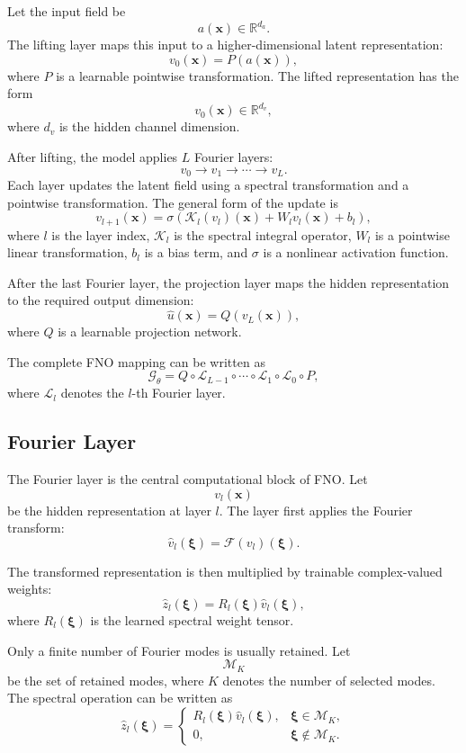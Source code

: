 \documentclass[14pt]{extarticle}
\begin{document}
Let the input field be
\[
a(\mathbf{x}) \in \mathbb{R}^{d_a}.
\]
The lifting layer maps this input to a higher-dimensional latent representation:
\[
v_0(\mathbf{x})
=
P(a(\mathbf{x})),
\]
where \(P\) is a learnable pointwise transformation. The lifted representation has the form
\[
v_0(\mathbf{x}) \in \mathbb{R}^{d_v},
\]
where \(d_v\) is the hidden channel dimension.

After lifting, the model applies \(L\) Fourier layers:
\[
v_0
\rightarrow
v_1
\rightarrow
\cdots
\rightarrow
v_L.
\]
Each layer updates the latent field using a spectral transformation and a pointwise transformation. The general form of the update is
\[
v_{l+1}(\mathbf{x})
=
\sigma
\left(
\mathcal{K}_l(v_l)(\mathbf{x})
+
W_l v_l(\mathbf{x})
+
b_l
\right),
\]
where \(l\) is the layer index, \(\mathcal{K}_l\) is the spectral integral operator, \(W_l\) is a pointwise linear transformation, \(b_l\) is a bias term, and \(\sigma\) is a nonlinear activation function.

After the last Fourier layer, the projection layer maps the hidden representation to the required output dimension:
\[
\hat{u}(\mathbf{x})
=
Q(v_L(\mathbf{x})),
\]
where \(Q\) is a learnable projection network.

The complete FNO mapping can be written as
\[
\mathcal{G}_{\theta}
=
Q
\circ
\mathcal{L}_{L-1}
\circ
\cdots
\circ
\mathcal{L}_{1}
\circ
\mathcal{L}_{0}
\circ
P,
\]
where \(\mathcal{L}_l\) denotes the \(l\)-th Fourier layer.

\subsection{Fourier Layer}

The Fourier layer is the central computational block of FNO. Let
\[
v_l(\mathbf{x})
\]
be the hidden representation at layer \(l\). The layer first applies the Fourier transform:
\[
\hat{v}_l(\boldsymbol{\xi})
=
\mathcal{F}
\left(
v_l
\right)
(\boldsymbol{\xi}).
\]

The transformed representation is then multiplied by trainable complex-valued weights:
\[
\hat{z}_l(\boldsymbol{\xi})
=
R_l(\boldsymbol{\xi})
\hat{v}_l(\boldsymbol{\xi}),
\]
where \(R_l(\boldsymbol{\xi})\) is the learned spectral weight tensor.

Only a finite number of Fourier modes is usually retained. Let
\[
\mathcal{M}_K
\]
be the set of retained modes, where \(K\) denotes the number of selected modes. The spectral operation can be written as
\[
\hat{z}_l(\boldsymbol{\xi})
=
\begin{cases}
R_l(\boldsymbol{\xi})\hat{v}_l(\boldsymbol{\xi}),
&
\boldsymbol{\xi} \in \mathcal{M}_K,
\\
0,
&
\boldsymbol{\xi} \notin \mathcal{M}_K.
\end{cases}
\]
\end{document}
